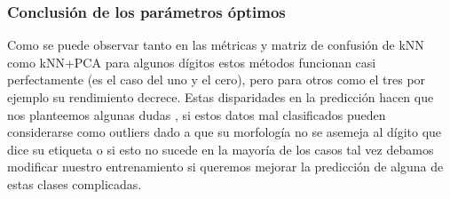 \subsubsection{Conclusión de los parámetros óptimos}


Como se puede observar tanto en las métricas y matriz de confusión de kNN como kNN+PCA para algunos dígitos estos métodos funcionan casi perfectamente (es el caso del uno y el cero), pero para otros como el tres por ejemplo su rendimiento decrece. Estas disparidades en la predicción hacen que nos planteemos algunas dudas , si estos datos mal clasificados pueden  considerarse como outliers dado a que su morfología no se asemeja al dígito que dice su etiqueta o si esto no sucede en la mayoría de los casos tal vez debamos modificar nuestro entrenamiento si queremos mejorar la predicción de alguna de estas clases complicadas.

